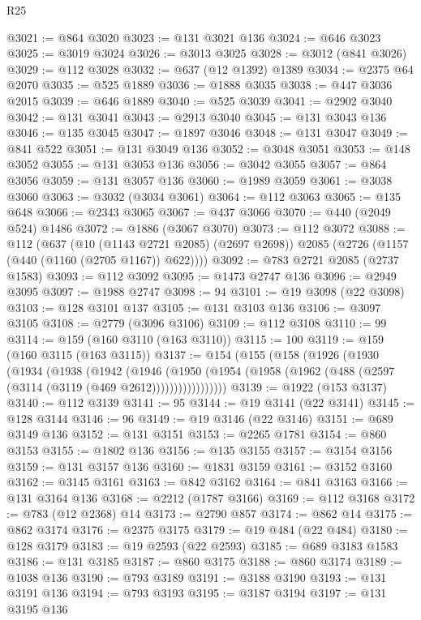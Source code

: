 \begin{lexlean}{R25}
\begin{coremodule}
@3021 := @864 @3020
@3023 := @131 @3021 @136
@3024 := @646 @3023
@3025 := @3019 @3024
@3026 := @3013 @3025
@3028 := @3012 (@841 @3026)
@3029 := @112 @3028
@3032 := @637 (@12 @1392) @1389
@3034 := @2375 @64 @2070
@3035 := @525 @1889
@3036 := @1888 @3035
@3038 := @447 @3036 @2015
@3039 := @646 @1889
@3040 := @525 @3039
@3041 := @2902 @3040
@3042 := @131 @3041
@3043 := @2913 @3040
@3045 := @131 @3043 @136
@3046 := @135 @3045
@3047 := @1897 @3046
@3048 := @131 @3047
@3049 := @841 @522
@3051 := @131 @3049 @136
@3052 := @3048 @3051
@3053 := @148 @3052
@3055 := @131 @3053 @136
@3056 := @3042 @3055
@3057 := @864 @3056
@3059 := @131 @3057 @136
@3060 := @1989 @3059
@3061 := @3038 @3060
@3063 := @3032 (@3034 @3061)
@3064 := @112 @3063
@3065 := @135 @648
@3066 := @2343 @3065
@3067 := @437 @3066
@3070 := @440 (@2049 @524) @1486
@3072 := @1886 (@3067 @3070)
@3073 := @112 @3072
@3088 := @112
    (@637
      (@10 (@1143 @2721 @2085) (@2697 @2698))
      @2085
      (@2726 (@1157 (@440 (@1160 (@2705 @1167)) @622))))
@3092 := @783 @2721 @2085 (@2737 @1583)
@3093 := @112 @3092
@3095 := @1473 @2747 @136
@3096 := @2949 @3095
@3097 := @1988 @2747
@3098 := 94
@3101 := @19 @3098 (@22 @3098)
@3103 := @128 @3101 @137
@3105 := @131 @3103 @136
@3106 := @3097 @3105
@3108 := @2779 (@3096 @3106)
@3109 := @112 @3108
@3110 := 99
@3114 := @159 (@160 @3110 (@163 @3110))
@3115 := 100
@3119 := @159 (@160 @3115 (@163 @3115))
@3137 := @154
    (@155
      (@158
        (@1926
          (@1930
            (@1934
              (@1938
                (@1942
                  (@1946
                    (@1950
                      (@1954 (@1958 (@1962 (@488 (@2597 (@3114 (@3119 (@469 @2612)))))))))))))))))
@3139 := @1922 (@153 @3137)
@3140 := @112 @3139
@3141 := 95
@3144 := @19 @3141 (@22 @3141)
@3145 := @128 @3144
@3146 := 96
@3149 := @19 @3146 (@22 @3146)
@3151 := @689 @3149 @136
@3152 := @131 @3151
@3153 := @2265 @1781
@3154 := @860 @3153
@3155 := @1802 @136
@3156 := @135 @3155
@3157 := @3154 @3156
@3159 := @131 @3157 @136
@3160 := @1831 @3159
@3161 := @3152 @3160
@3162 := @3145 @3161
@3163 := @842 @3162
@3164 := @841 @3163
@3166 := @131 @3164 @136
@3168 := @2212 (@1787 @3166)
@3169 := @112 @3168
@3172 := @783 (@12 @2368) @14
@3173 := @2790 @857
@3174 := @862 @14
@3175 := @862 @3174
@3176 := @2375 @3175
@3179 := @19 @484 (@22 @484)
@3180 := @128 @3179
@3183 := @19 @2593 (@22 @2593)
@3185 := @689 @3183 @1583
@3186 := @131 @3185
@3187 := @860 @3175
@3188 := @860 @3174
@3189 := @1038 @136
@3190 := @793 @3189
@3191 := @3188 @3190
@3193 := @131 @3191 @136
@3194 := @793 @3193
@3195 := @3187 @3194
@3197 := @131 @3195 @136

\end{coremodule}
\end{lexlean}
